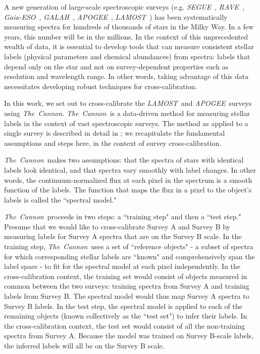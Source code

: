 \documentclass[12pt, preprint]{aastex}
\newcommand{\tc}{\textsl{The~Cannon}}
\newcommand{\apogee}{\textsl{APOGEE}}
\newcommand{\lamost}{\textsl{LAMOST}}
\newcommand{\segue}{\textsl{SEGUE}}
\newcommand{\rave}{\textsl{RAVE}}
\newcommand{\galah}{\textsl{GALAH}}
\newcommand{\gaiaeso}{\textsl{Gaia-ESO}}
\begin{document}
A new generation of large-scale spectroscopic surveys (e.g. \segue\ \citep{Beers}, \rave\ \citep{Steinmetz2006}, \gaiaeso\ \citep{Gilmore2012}, \galah\ \citep{Freeman2012}, \apogee\ \citep{Majewski2012}, \lamost\ \citep{Newberg2012}) has been systematically 
measuring spectra for hundreds of thousands of stars in the Milky Way. In a few years,
this number will be in the millions. 
In the context of this unprecedented wealth of data, 
it is essential to develop tools that can measure consistent stellar labels 
(physical parameters and chemical abundances) from spectra: labels that
depend only on the star and not on survey-dependent properties such
as resolution and wavelength range. In other words, taking advantage of this data
necessitates developing robust techniques for cross-calibration. 

In this work, we set out to cross-calibrate the \lamost\ and \apogee\ surveys
using \tc. \tc\ is a data-driven method for measuring stellar labels in the context
of vast spectroscopic surveys. 
The method as applied to a single survey is described in detail in \citet{ness2015}; 
we recapitulate the fundamental assumptions and steps here, in the context of survey cross-calibration. 

\tc\ makes two assumptions: that the spectra of stars with identical labels look identical,
and that spectra vary smoothly with label changes. In other words, the continuum-normalized flux at each pixel in the spectrum is a smooth function of the labels. The function
that maps the flux in a pixel to the object's labels is called the ``spectral model." 

\tc\ proceeds in two steps: a ``training step" and then a ``test step." 
Presume that we would like to cross-calibrate Survey A and Survey B by measuring
labels for Survey A spectra that are on the Survey B scale.  
In the training step, \tc\ uses a set of ``reference objects" - a subset of spectra for
which corresponding stellar labels are ``known" and comprehensively
span the label space - to fit for the spectral model at each 
pixel independently. In the cross-calibration context, the training set would
consist of objects measured in common between the two surveys: training
spectra from Survey A and training labels from Survey B. 
The spectral model would thus map Survey A spectra to Survey B labels. 
In the test step, the spectral model is applied to each of the remaining objects
(known collectively as the ``test set") to infer their labels. 
In the cross-calibration context, the test set would consist of all the 
non-training spectra from Survey A. 
Because the model was trained on Survey B-scale labels, the inferred
labels will all be on the Survey B scale. 
\end{document}
